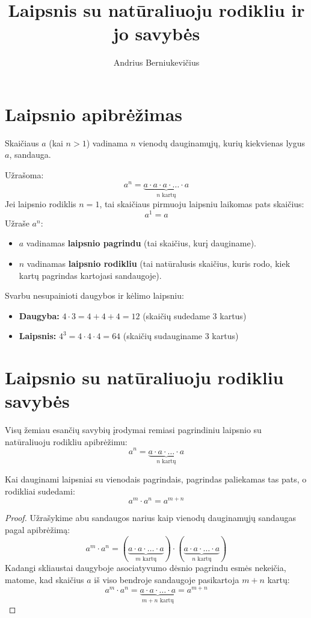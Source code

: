 \documentclass[11pt,a4paper]{scrartcl}
\title{Laipsnis su natūraliuoju rodikliu ir jo savybės}
\author{Andrius Berniukevičius}
\begin{document}
\maketitle


\section{Laipsnio apibrėžimas}

\begin{definition}
   Skaičiaus $a$  (kai $n > 1$) vadinama $n$ vienodų dauginamųjų, kurių kiekvienas lygus $a$, sandauga.
\end{definition}

Užrašoma:
$$a^n = \underbrace{a \cdot a \cdot a \cdot \dots \cdot a}_{n \text{ kartų}}$$
Jei laipsnio rodiklis $n = 1$, tai skaičiaus pirmuoju laipsniu laikomas pats skaičius: $$a^1 = a$$
Užraše $a^n$:
\begin{itemize}
    \item \textbf{$a$} vadinamas \textbf{laipsnio pagrindu} (tai skaičius, kurį dauginame).
    \item \textbf{$n$} vadinamas \textbf{laipsnio rodikliu} (tai natūralusis skaičius, kuris rodo, kiek kartų pagrindas kartojasi sandaugoje).
\end{itemize}

\begin{remark}
    Svarbu nesupainioti daugybos ir kėlimo laipsniu:
\begin{itemize}
    \item \textbf{Daugyba:} $4 \cdot 3 = 4 + 4 + 4 = 12$ (skaičių sudedame $3$ kartus)
    \item \textbf{Laipsnis:} $4^3 = 4 \cdot 4 \cdot 4 = 64$ (skaičių sudauginame $3$ kartus)
\end{itemize}
\end{remark}

\section{Laipsnio su natūraliuoju rodikliu savybės}
Visų žemiau esančių savybių įrodymai remiasi pagrindiniu laipsnio su natūraliuoju rodikliu apibrėžimu: 
$$a^n = \underbrace{a \cdot a \cdot \dots \cdot a}_{n \text{ kartų}}$$ 
\begin{property}
Kai dauginami laipsniai su vienodais pagrindais, pagrindas paliekamas tas pats, o rodikliai sudedami:
$$a^m \cdot a^n = a^{m+n}$$
\end{property}
\begin{proof}
Užrašykime abu sandaugos narius kaip vienodų dauginamųjų sandaugas pagal apibrėžimą:
$$a^m \cdot a^n = (\underbrace{a \cdot a \cdot \dots \cdot a}_{m \text{ kartų}}) \cdot (\underbrace{a \cdot a \cdot \dots \cdot a}_{n \text{ kartų}})$$
Kadangi skliaustai daugyboje asociatyvumo dėsnio pagrindu esmės nekeičia, matome, kad skaičius $a$ iš viso bendroje sandaugoje pasikartoja $m + n$ kartų:
$$a^m \cdot a^n = \underbrace{a \cdot a \cdot \dots \cdot a}_{m+n \text{ kartų}} = a^{m+n}$$
\end{proof}
\end{document}

